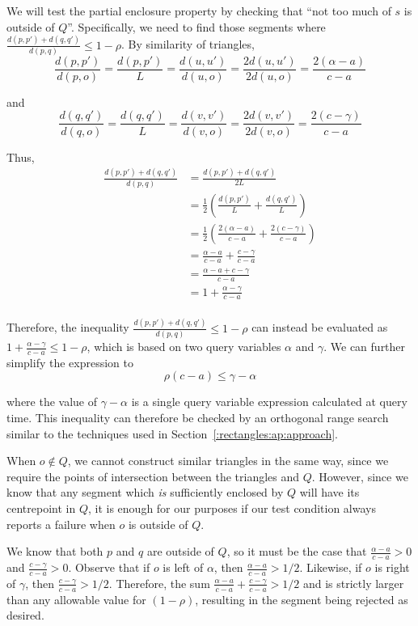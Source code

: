 We will test the partial enclosure property by checking that ``not too much of $s$ is outside of $Q$''. Specifically, we need to find those segments where $\frac{d(p, p') + d(q, q')}{d(p, q)} \leq 1 - \rho$. By similarity of triangles, 
\[ 
\frac{d(p, p')}{d(p, o)} = \frac{d(p, p')}{L} = \frac{d(u, u')}{d(u, o)} = \frac{2 d(u, u')}{2 d(u, o)} = \frac{2(\alpha - a)}{c - a}
\]

\noindent and 
\[ 
\frac{d(q, q')}{d(q, o)} = \frac{d(q, q')}{L} = \frac{d(v, v')}{d(v, o)} = \frac{2 d(v, v')}{2 d(v, o)} = \frac{2(c - \gamma)}{c - a}
\]

\noindent Thus,
\[
\begin{split} 
\frac{d(p, p') + d(q, q')}{d(p, q)}
%
&= \frac{d(p, p') + d(q, q')}{2L} \\
%
&= \frac{1}{2} \left ( \frac{d(p, p')}{L} + \frac{d(q, q')}{L} \right ) \\
%
&= \frac{1}{2} \left ( \frac{2(\alpha - a)}{c - a} + \frac{2(c - \gamma)}{c - a} \right ) \\
%
&= \frac{\alpha - a}{c - a} + \frac{c - \gamma}{c - a} \\
%
&= \frac{\alpha - a + c - \gamma}{c - a} \\
%
&= 1 + \frac{\alpha - \gamma}{c - a} \\
%
\end{split}
\]

\noindent Therefore, the inequality $\frac{d(p, p') + d(q, q')}{d(p, q)} \leq 1 - \rho$ can instead be evaluated as $1 + \frac{\alpha - \gamma}{c - a} \leq 1 - \rho$, which is based on two query variables $\alpha$ and $\gamma$.  
We can further simplify the expression to
\[ 
\rho(c - a) \leq \gamma - \alpha
\]

\noindent where the value of $\gamma - \alpha$ is a single query variable expression calculated at query time.  This inequality can therefore be checked by an orthogonal range search similar to the techniques used in Section~\ref{:rectangles:ap:approach}.

When $o \not \in Q$, we cannot construct similar triangles in the same way, since we require the points of intersection between the triangles and $Q$.  
However, since we know that any segment which \emph{is} sufficiently enclosed by $Q$ will have its centrepoint in $Q$, it is enough for our purposes if our test condition always reports a failure when $o$ is outside of $Q$.

We know that both $p$ and $q$ are outside of $Q$, so it must be the case that $\frac{\alpha - a}{c - a} > 0$ and $\frac{c - \gamma}{c - a} > 0$. Observe that if $o$ is left of $\alpha$, then $\frac{\alpha - a}{c - a} > 1/2$. Likewise, if $o$ is right of $\gamma$, then $\frac{c - \gamma}{c - a} > 1/2$. Therefore, the sum $\frac{\alpha - a}{c - a} + \frac{c - \gamma}{c - a} > 1/2$ and is strictly larger than any allowable value for $(1 - \rho)$, resulting in the segment being rejected as desired.


